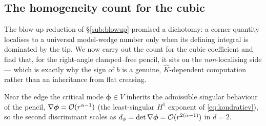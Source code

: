 \subsection{The homogeneity count for the cubic}
\label{sub:bcount}

The blow-up reduction of \S\ref{sub:blowup} promised a dichotomy: a corner quantity localises to a universal
model-wedge number only when its defining integral is dominated by the tip. We now carry out the count for the cubic
coefficient and find that, for the right-angle clamped--free pencil, it sits on the \emph{non}-localising side ---
which is exactly why the sign of $b$ is a genuine, $\hat K$-dependent computation rather than an inheritance from flat
creasing.

Near the edge the critical mode $\bm{\phi}\in V$ inherits the admissible singular behaviour of the pencil,
$\nabla\bm{\phi}=\mathcal{O}(r^{\alpha-1})$ (the least-singular $H^1$ exponent of \eqref{eq:kondratiev}), so the second
discriminant scales as $d_\phi=\det\nabla\bm{\phi}=\mathcal{O}(r^{2(\alpha-1)})$ in $d=2$.

